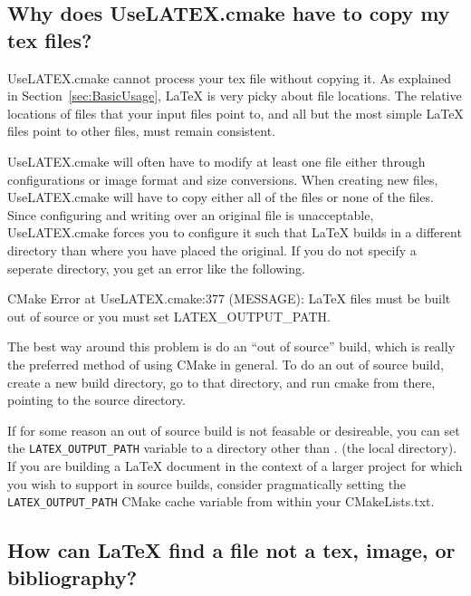 \documentclass{article}
\newcommand*{\textfile}[1]{\textsf{#1}}
\newcommand*{\textcmake}[1]{\texttt{#1}}
\newcommand*{\textcmakevar}[1]{\textcmake{#1}}
\newcommand*{\UseLATEX}{\textfile{UseLATEX.cmake}\xspace}
\newcommand*{\latex}{\LaTeX\xspace}
\begin{document}
  \subsection{Why does \UseLATEX have to copy my tex files?}
  \label{sec:Why_does_UseLATEX_have_to_copy_my_tex_files}

  \UseLATEX cannot process your tex file without copying it.  As explained
  in Section~\ref{sec:BasicUsage}, \latex is very picky about file locations.
  The relative locations of files that your input files point to, and all
  but the most simple \latex files point to other files, must remain
  consistent.

  \UseLATEX will often have to modify at least one file either through
  configurations or image format and size conversions.  When creating new
  files, \UseLATEX will have to copy either all of the files or none of the
  files.  Since configuring and writing over an original file is
  unacceptable, \UseLATEX forces you to configure it such that \latex
  builds in a different directory than where you have placed the original.
  If you do not specify a seperate directory, you get an error like the
  following.

  \begin{CodeListing}
CMake Error at UseLATEX.cmake:377 (MESSAGE):
  LaTeX files must be built out of source or you must set
  LATEX_OUTPUT_PATH.
  \end{CodeListing}

  The best way around this problem is do an ``out of source'' build, which
  is really the preferred method of using CMake in general.  To do an out
  of source build, create a new build directory, go to that directory, and
  run cmake from there, pointing to the source directory.

  If for some reason an out of source build is not feasable or desireable,
  you can set the \textcmakevar{LATEX\_OUTPUT\_PATH} variable to a
  directory other than \textfile{.} (the local directory).  If you are
  building a \latex document in the context of a larger project for which
  you wish to support in source builds, consider pragmatically setting the
  \textcmakevar{LATEX\_OUTPUT\_PATH} CMake cache variable from within your
  \textfile{CMakeLists.txt}.

  \subsection{How can \latex find a file not a tex, image, or bibliography?}
  \label{sec:How_can_latex_find_a_file_not_a_tex_image_or_bibliography}
\end{document}
